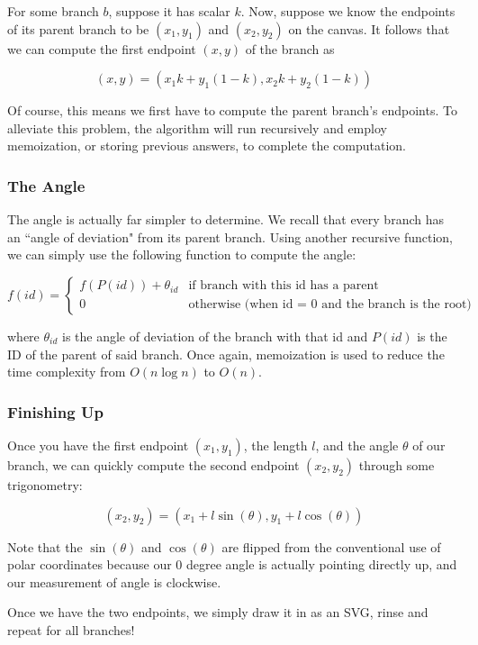 For some branch $b$, suppose it has scalar $k$. Now, suppose we know the endpoints of its parent branch to be $(x_1,y_1)$ and $(x_2,y_2)$ on the canvas. It follows that we can compute the first endpoint $(x,y)$ of the branch as

$$(x,y) = \left(x_1k + y_1(1-k), x_2k + y_2(1-k)\right)$$

Of course, this means we first have to compute the parent branch's endpoints. To alleviate this problem, the algorithm will run recursively and employ memoization, or storing previous answers, to complete the computation.

\subsubsection{The Angle}

The angle is actually far simpler to determine. We recall that every branch has an ``angle of deviation" from its parent branch. Using another recursive function, we can simply use the following function to compute the angle:

$$f(id) = \begin{cases}
    f(P(id)) + \theta_{id} & \text{if branch with this id has a parent} \\
    0 & \text{otherwise (when id = 0 and the branch is the root)}
\end{cases}$$

where $\theta_{id}$ is the angle of deviation of the branch with that id and $P(id)$ is the ID of the parent of said branch. Once again, memoization is used to reduce the time complexity from $O(n \log n)$ to $O(n)$.

\subsubsection{Finishing Up}

Once you have the first endpoint $(x_1,y_1)$, the length $l$, and the angle $\theta$ of our branch, we can quickly compute the second endpoint $(x_2,y_2)$ through some trigonometry:

$$(x_2,y_2) = (x_1 + l\sin(\theta),y_1+l\cos(\theta))$$

Note that the $\sin(\theta)$ and $\cos(\theta)$ are flipped from the conventional use of polar coordinates because our 0 degree angle is actually pointing directly up, and our measurement of angle is clockwise.

Once we have the two endpoints, we simply draw it in as an SVG, rinse and repeat for all branches!
